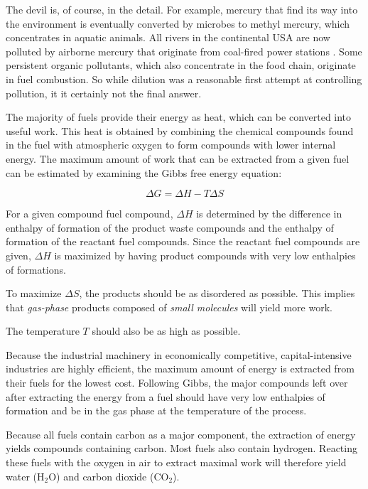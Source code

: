 The devil is, of course, in the detail. For example, mercury that find its way
into the environment is eventually converted by microbes to methyl mercury,
which concentrates in aquatic animals. All rivers in the continental USA are now
polluted by airborne mercury that originate from coal-fired power stations
\autocite{Wentz2014}. Some persistent organic pollutants, which also concentrate
in the food chain, originate in fuel combustion. So while dilution was a
reasonable first attempt at controlling pollution, it it certainly not the final
answer.

The majority of fuels provide their energy as heat, which can be converted into
useful work. This heat is obtained by combining the chemical compounds found in
the fuel with atmospheric oxygen to form compounds with lower internal energy. The
maximum amount of work that can be extracted from a given fuel can be estimated
by examining the Gibbs free energy equation:

\begin{equation}
	\Delta G = \Delta H - T \Delta S
\label{eq:Gibbs}
\end{equation}

For a given compound fuel compound, $\Delta H$ is determined by the difference
in enthalpy of formation of the product waste compounds and the enthalpy of
formation of the reactant fuel compounds. Since the reactant fuel compounds are
given, $\Delta H$ is maximized by having product compounds with very low
enthalpies of formations.

To maximize $\Delta S$, the products should be as disordered as possible. This
implies that \emph{gas-phase} products composed of \emph{small molecules} will
yield more work.

The temperature $T$ should also be as high as possible.

Because the industrial machinery in economically competitive, capital-intensive
industries are highly efficient, the maximum amount of energy is extracted from
their fuels for the lowest cost. Following Gibbs, the major compounds left over
after extracting the energy from a fuel should have very low enthalpies of
formation and be in the gas phase at the temperature of the process. 

Because all fuels contain carbon as a major component, the extraction of energy
yields compounds containing carbon. Most fuels also contain hydrogen. Reacting
these fuels with the oxygen in air to extract maximal work will therefore
yield water (H$_2$O) and carbon dioxide (CO$_2$). 

